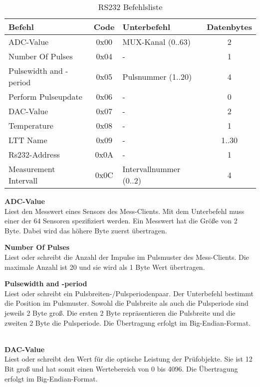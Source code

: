 \begin{table}[H]
\begin{center}
\begin{tabularx}{\textwidth}{|X|c|X|c|}\hline 
 Befehl & Code & Unterbefehl & Datenbytes \\ \hline \hline
 ADC-Value & 0x00 & MUX-Kanal (0..63) & 2  \\ \hline
 Number Of Pulses & 0x04 & - & 1  \\ \hline
 Pulsewidth and -period & 0x05 & Pulsnummer (1..20) & 4  \\ \hline
 Perform Pulseupdate & 0x06 & - & 0   \\ \hline
 DAC-Value & 0x07 & - & 2 \\ \hline
 Temperature & 0x08 & - & 1  \\ \hline
 LTT Name & 0x09 & - & 1..30  \\ \hline
 Rs232-Address & 0x0A & - & 1 \\ \hline
 Measurement Intervall & 0x0C & Intervallnummer (0..2) & 4 \\ \hline
\end{tabularx}
\caption{RS232 Befehlsliste}
\label{table_RS232Commands}
\end{center}
\end{table}

\textbf{ADC-Value}\\
Liest den Messwert eines Sensors des Mess-Clients. Mit dem Unterbefehl muss einer der 64 Sensoren spezifiziert werden. Ein Messwert hat die Größe von 2 Byte. Dabei wird das höhere Byte zuerst übertragen.\ 

\textbf{Number Of Pulses}\\
Liest oder schreibt die Anzahl der Impulse im Pulsmuster des Mess-Clients. Die maximale Anzahl ist 20 und sie wird als 1 Byte Wert übertragen.\ 

\textbf{Pulsewidth and -period}\\
Liest oder schreibt  ein Pulsbreiten-/Pulsperiodenpaar. Der Unterbefehl bestimmt die Position im Pulsmuster. Sowohl die Pulsbreite als auch die Pulsperiode sind jeweils 2 Byte groß. Die ersten 2 Byte repräsentieren die Pulsbreite und die zweiten 2 Byte die Pulsperiode. Die Übertragung erfolgt im Big-Endian-Format. \ 

\textbf{DAC-Value}\\
Liest oder schreibt den Wert für die optische Leistung der Prüfobjekte. Sie ist 12 Bit groß und hat somit einen Wertebereich von 0 bis 4096. Die Übertragung erfolgt im Big-Endian-Format.\ 

